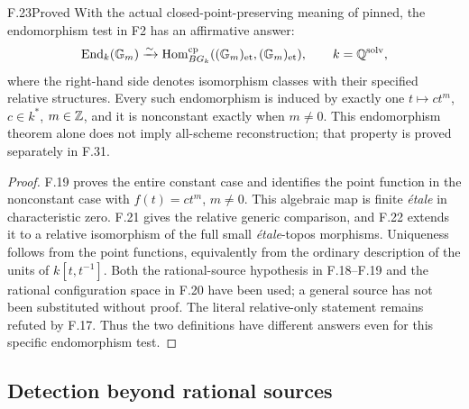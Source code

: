 \begin{claim}{F.23}{Proved}
With the actual closed-point-preserving meaning of pinned, the
endomorphism test in F2 has an affirmative answer:
\[
 \operatorname{End}_{k}(\mathbb G_m)
 \xrightarrow{\sim}
 \operatorname{Hom}^{\mathrm{cp}}_{BG_k}
       ((\mathbb G_m)_{\mathrm{et}},(\mathbb G_m)_{\mathrm{et}}),
 \qquad k=\mathbb Q^{\mathrm{solv}},
\]
where the right-hand side denotes isomorphism classes with their
specified relative structures. Every such endomorphism is
induced by exactly one $t\mapsto ct^m$, $c\in k^*$,
$m\in\mathbb Z$, and it is nonconstant exactly when $m\ne0$.
This endomorphism theorem alone does not imply all-scheme
reconstruction; that property is proved separately in F.31.
\end{claim}
\begin{proof}
F.19 proves the entire constant case and identifies the point
function in the nonconstant case with $f(t)=ct^m$, $m\ne0$.
This algebraic map is finite \emph{\'etale} in characteristic
zero. F.21 gives the relative generic comparison, and F.22
extends it to a relative isomorphism of the full small
\emph{\'etale}-topos morphisms. Uniqueness follows from the
point functions, equivalently from the ordinary description of
the units of $k[t,t^{-1}]$. Both the rational-source hypothesis
in F.18--F.19 and the rational configuration space in F.20 have
been used; a general source has not been substituted without
proof. The literal relative-only statement remains refuted by
F.17. Thus the two definitions have different answers even for
this specific endomorphism test.
\end{proof}

\subsection{Detection beyond rational sources}

